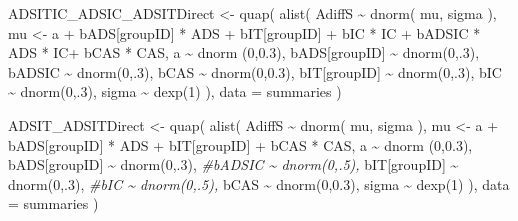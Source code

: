 \documentclass[
  10pt,
  dvipsnames,enabledeprecatedfontcommands]{scrartcl}
\newenvironment{Shaded}{\begin{snugshade}}{\end{snugshade}}
\newcommand{\AttributeTok}[1]{\textcolor[rgb]{0.77,0.63,0.00}{#1}}
\newcommand{\CommentTok}[1]{\textcolor[rgb]{0.56,0.35,0.01}{\textit{#1}}}
\newcommand{\DecValTok}[1]{\textcolor[rgb]{0.00,0.00,0.81}{#1}}
\newcommand{\FloatTok}[1]{\textcolor[rgb]{0.00,0.00,0.81}{#1}}
\newcommand{\FunctionTok}[1]{\textcolor[rgb]{0.00,0.00,0.00}{#1}}
\newcommand{\NormalTok}[1]{#1}
\newcommand{\OtherTok}[1]{\textcolor[rgb]{0.56,0.35,0.01}{#1}}
\newcommand{\SpecialCharTok}[1]{\textcolor[rgb]{0.00,0.00,0.00}{#1}}
\begin{document}
\begin{Shaded}
\begin{Highlighting}[]
\NormalTok{ADSITIC\_ADSIC\_ADSITDirect }\OtherTok{\textless{}{-}} \FunctionTok{quap}\NormalTok{(}
  \FunctionTok{alist}\NormalTok{(}
\NormalTok{    AdiffS }\SpecialCharTok{\textasciitilde{}} \FunctionTok{dnorm}\NormalTok{( mu, sigma ),}
\NormalTok{    mu }\OtherTok{\textless{}{-}}\NormalTok{ a }\SpecialCharTok{+}\NormalTok{ bADS[groupID] }\SpecialCharTok{*}\NormalTok{ ADS }\SpecialCharTok{+}\NormalTok{  bIT[groupID] }\SpecialCharTok{+}\NormalTok{ bIC }\SpecialCharTok{*}\NormalTok{ IC }\SpecialCharTok{+}\NormalTok{ bADSIC }\SpecialCharTok{*}\NormalTok{ ADS }\SpecialCharTok{*}\NormalTok{ IC}\SpecialCharTok{+}\NormalTok{ bCAS }\SpecialCharTok{*}\NormalTok{ CAS,}
\NormalTok{    a }\SpecialCharTok{\textasciitilde{}} \FunctionTok{dnorm}\NormalTok{ (}\DecValTok{0}\NormalTok{,}\FloatTok{0.3}\NormalTok{),}
\NormalTok{    bADS[groupID] }\SpecialCharTok{\textasciitilde{}} \FunctionTok{dnorm}\NormalTok{(}\DecValTok{0}\NormalTok{,.}\DecValTok{3}\NormalTok{),}
\NormalTok{    bADSIC }\SpecialCharTok{\textasciitilde{}} \FunctionTok{dnorm}\NormalTok{(}\DecValTok{0}\NormalTok{,.}\DecValTok{3}\NormalTok{),}
\NormalTok{    bCAS }\SpecialCharTok{\textasciitilde{}} \FunctionTok{dnorm}\NormalTok{(}\DecValTok{0}\NormalTok{,}\FloatTok{0.3}\NormalTok{),}
\NormalTok{    bIT[groupID] }\SpecialCharTok{\textasciitilde{}} \FunctionTok{dnorm}\NormalTok{(}\DecValTok{0}\NormalTok{,.}\DecValTok{3}\NormalTok{),}
\NormalTok{    bIC }\SpecialCharTok{\textasciitilde{}} \FunctionTok{dnorm}\NormalTok{(}\DecValTok{0}\NormalTok{,.}\DecValTok{3}\NormalTok{),}
\NormalTok{    sigma  }\SpecialCharTok{\textasciitilde{}} \FunctionTok{dexp}\NormalTok{(}\DecValTok{1}\NormalTok{)}
\NormalTok{  ), }
  \AttributeTok{data =}\NormalTok{ summaries}
\NormalTok{)}


\NormalTok{ADSIT\_ADSITDirect }\OtherTok{\textless{}{-}} \FunctionTok{quap}\NormalTok{(}
  \FunctionTok{alist}\NormalTok{(}
\NormalTok{    AdiffS }\SpecialCharTok{\textasciitilde{}} \FunctionTok{dnorm}\NormalTok{( mu, sigma ),}
\NormalTok{    mu }\OtherTok{\textless{}{-}}\NormalTok{ a }\SpecialCharTok{+}\NormalTok{ bADS[groupID] }\SpecialCharTok{*}\NormalTok{ ADS }\SpecialCharTok{+}\NormalTok{  bIT[groupID] }\SpecialCharTok{+}\NormalTok{ bCAS }\SpecialCharTok{*}\NormalTok{ CAS,}
\NormalTok{    a }\SpecialCharTok{\textasciitilde{}} \FunctionTok{dnorm}\NormalTok{ (}\DecValTok{0}\NormalTok{,}\FloatTok{0.3}\NormalTok{),}
\NormalTok{    bADS[groupID] }\SpecialCharTok{\textasciitilde{}} \FunctionTok{dnorm}\NormalTok{(}\DecValTok{0}\NormalTok{,.}\DecValTok{3}\NormalTok{),}
    \CommentTok{\#bADSIC \textasciitilde{} dnorm(0,.5),}
\NormalTok{    bIT[groupID] }\SpecialCharTok{\textasciitilde{}} \FunctionTok{dnorm}\NormalTok{(}\DecValTok{0}\NormalTok{,.}\DecValTok{3}\NormalTok{),}
    \CommentTok{\#bIC \textasciitilde{} dnorm(0,.5),}
\NormalTok{    bCAS }\SpecialCharTok{\textasciitilde{}} \FunctionTok{dnorm}\NormalTok{(}\DecValTok{0}\NormalTok{,}\FloatTok{0.3}\NormalTok{),}
\NormalTok{    sigma  }\SpecialCharTok{\textasciitilde{}} \FunctionTok{dexp}\NormalTok{(}\DecValTok{1}\NormalTok{)}
\NormalTok{  ), }
  \AttributeTok{data =}\NormalTok{ summaries}
\NormalTok{)}



\end{Highlighting}
\end{Shaded}
\end{document}
